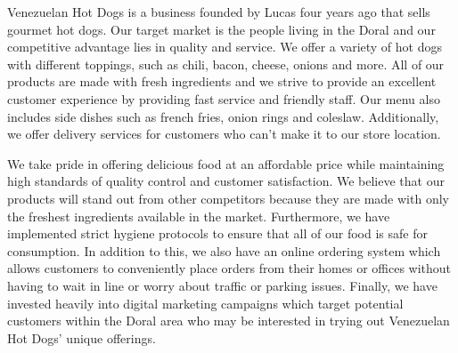  

Venezuelan Hot Dogs is a business founded by Lucas four years ago that sells gourmet hot dogs. Our target market is the people living in the Doral and our competitive advantage lies in quality and service. We offer a variety of hot dogs with different toppings, such as chili, bacon, cheese, onions and more. All of our products are made with fresh ingredients and we strive to provide an excellent customer experience by providing fast service and friendly staff. Our menu also includes side dishes such as french fries, onion rings and coleslaw. Additionally, we offer delivery services for customers who can't make it to our store location. 

We take pride in offering delicious food at an affordable price while maintaining high standards of quality control and customer satisfaction. We believe that our products will stand out from other competitors because they are made with only the freshest ingredients available in the market. Furthermore, we have implemented strict hygiene protocols to ensure that all of our food is safe for consumption. In addition to this, we also have an online ordering system which allows customers to conveniently place orders from their homes or offices without having to wait in line or worry about traffic or parking issues. Finally, we have invested heavily into digital marketing campaigns which target potential customers within the Doral area who may be interested in trying out Venezuelan Hot Dogs' unique offerings.